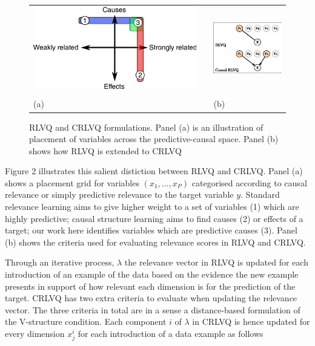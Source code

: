 \documentclass{esannV2}
\begin{document}
\begin{figure}[!h]
\begin{tabular}{m{}cm{}}
\includegraphics[width=.5\textwidth]{causal-relevance-dimensions.eps} & &
\includegraphics[width=.4\textwidth]{rlvq-crlvq.eps} \\
& \\
(a) & & (b)  
\end{tabular}
\label{fig:causes}
\caption{RLVQ and CRLVQ formulations. Panel (a) is an illustration of placement of variables across the predictive-causal space. Panel (b) shows how RLVQ is extended to CRLVQ}
\end{figure}

Figure 2 illustrates this salient distiction between RLVQ and CRLVQ. Panel (a) shows a placement grid for variables $(x_1, \ldots, x_P)$ categorised according to causal relevance or simply predictive relevance to the target variable $y$. Standard relevance learning aims to give higher weight to a set of variables (1) which are highly predictive; causal structure learning aims to find causes (2) or effects of a target; our work here identifies variables which are predictive causes (3). Panel (b) shows the criteria used for evaluating relevance scores in RLVQ and CRLVQ.

Through an iterative process, $\lambda$ the relevance vector in RLVQ is updated for each introduction of an example of the data based on the evidence the new example presents in support of how relevant each dimension is  for the prediction of the target. CRLVQ has two extra criteria to evaluate when updating the relevance vector. The three criteria in total are in a sense a distance-based formulation of the V-structure condition. Each component $i$ of $\lambda$ in CRLVQ is hence updated for every dimension $x_j^i$ for each introduction of a data example as follows
\end{document}

